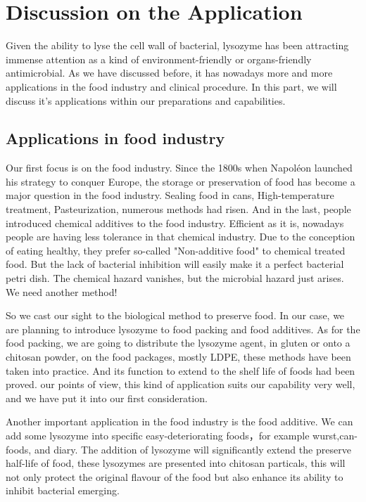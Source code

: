 \section{Discussion on the Application}
Given the ability to lyse the cell wall of bacterial,
lysozyme has been attracting immense attention as a kind of 
environment-friendly or organs-friendly antimicrobial.
As we have discussed before, it has nowadays more and more applications in the food industry and clinical procedure. In this part,  we will discuss 
it's applications within our preparations and capabilities.
\subsection{Applications in food industry}
Our first focus is on the food industry. Since the 1800s when Napoléon launched his strategy to conquer Europe, the storage or preservation of food has become a major question in the food industry. Sealing food in cans, High-temperature treatment, Pasteurization, numerous methods had risen. And in the last, people introduced chemical additives to the food industry. Efficient as it is, nowadays people are having less tolerance in that chemical industry. Due to the conception of eating healthy, they prefer so-called "Non-additive food" to chemical treated food. But the lack of bacterial inhibition will easily make it a perfect bacterial petri dish. The chemical hazard vanishes, but the microbial hazard just arises. We need another method!

So we cast our sight to the biological method to preserve food. In our case, we are planning to introduce lysozyme to food packing and food additives. As for the food packing, we are going to distribute the lysozyme agent, in gluten\citep{Conte2006} or onto a chitosan powder, on the food packages, mostly LDPE, these methods have been taken into practice\citep{Borzooeian2017}. And its function to extend to the shelf life of foods had been proved.\citep{Lian2012, Alhazmi2014} our points of view, this kind of application suits our capability very well, and we have put it into our first consideration.

Another important application in the food industry is the food additive. We can add some lysozyme into specific easy-deteriorating foods，for example wurst,can-foods, and diary. The addition of lysozyme will significantly extend the preserve half-life of food, these lysozymes are presented into chitosan particals\citep{Wu2017}, this will not only protect the original flavour of the food but also enhance its ability to inhibit bacterial emerging.
